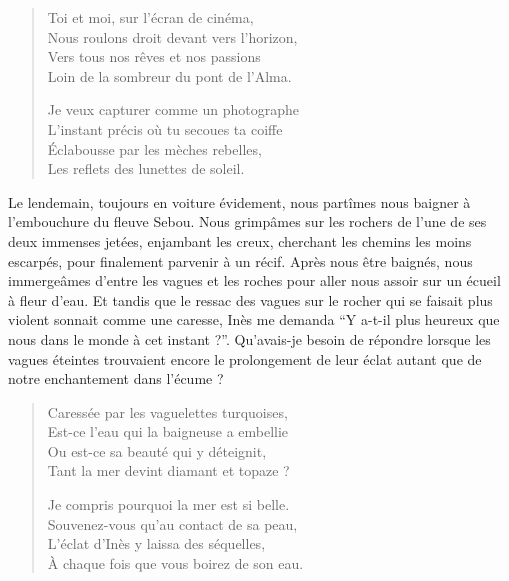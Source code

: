 \begin{verse}%
  \quatrain%
  Toi et moi, sur l’écran de cinéma,\\  %
  Nous roulons droit devant vers l’horizon,\\  %
  Vers tous nos rêves et nos passions\\  %
  Loin de la sombreur du pont de l’Alma.

  Je veux capturer comme un photographe\\  %
  L’instant précis où tu secoues ta coiffe\\  %
  Éclabousse par les mèches rebelles,\\  %
  Les reflets des lunettes de soleil.
\end{verse}

\begin{prose}
  Le lendemain, toujours en voiture évidement, nous partîmes nous baigner à l’embouchure du fleuve Sebou. Nous grimpâmes  sur les rochers de l’une de ses deux immenses jetées, enjambant les creux, cherchant les chemins les moins escarpés, pour finalement parvenir à un récif. Après nous être baignés, nous immergeâmes d’entre les vagues et les roches pour aller nous assoir sur un écueil à fleur d’eau. Et tandis que le ressac des vagues sur le rocher qui se faisait plus violent sonnait comme une caresse, Inès me demanda \enquote{Y a-t-il plus heureux que nous dans le monde à cet instant ?}. Qu’avais-je besoin de  répondre lorsque les vagues éteintes trouvaient encore le prolongement de leur éclat autant que de notre enchantement dans l’écume ?
\end{prose}

\begin{verse}%
  \quatrain%
  Caressée par les vaguelettes turquoises,\\  %
  Est-ce l’eau qui la baigneuse a embellie\\  %
  Ou est-ce sa beauté qui y déteignit,\\  %
  Tant la mer devint diamant et topaze ?

  Je compris pourquoi la mer est si belle.\\  %
  Souvenez-vous qu’au contact de sa peau,\\  %
  L’éclat d’Inès y laissa des séquelles,\\  %
  À chaque fois que vous boirez de son eau.
\end{verse}

